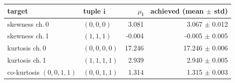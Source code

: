 \begin{tabular}{l l r r}
target & tuple $\mathbf{i}$ & $\mu_\mathbf{i}$ & achieved (mean $\pm$ std) \\
\hline
skewness ch.\,0 & $(0,0,0)$ & 3.081 & 3.067 $\pm$ 0.012 \\
skewness ch.\,1 & $(1,1,1)$ & -0.004 & -0.005 $\pm$ 0.005 \\
kurtosis ch.\,0 & $(0,0,0,0)$ & 17.246 & 17.246 $\pm$ 0.006 \\
kurtosis ch.\,1 & $(1,1,1,1)$ & 2.939 & 2.940 $\pm$ 0.005 \\
co-kurtosis $(0,0,1,1)$ & $(0,0,1,1)$ & 1.314 & 1.315 $\pm$ 0.003 \\
\end{tabular}
